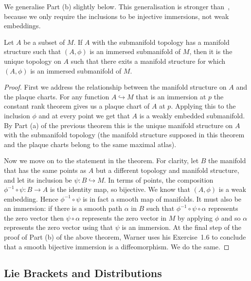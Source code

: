 We generalise Part (b) slightly below.
This generalisation is stronger than~\cite[Lem~2.1.41]{Sharpe1997}, because we only require the inclusions to be injective immersions, not weak embeddings.

\begin{theorem}
\label{thm:unique manifold structure}
Let $A$ be a subset of $M$. 
If $A$ with the submanifold topology has a manifold structure such that $(A,\phi)$ is an immersed submanifold of $M$, then it is the unique topology on $A$ such that there exits a manifold structure for which $(A,\phi)$ is an immersed submanifold of $M$.
\end{theorem}
\begin{proof}
First we address the relationship between the manifold structure on $A$ and the plaque charts.
For any function $A \hookrightarrow M$ that is an immersion at $p$ the constant rank theorem gives us a plaque chart of $A$ at $p$.
Applying this to the inclusion $\phi$ and at every point we get that $A$ is a weakly embedded submanifold.
By Part (a) of the previous theorem this is the unique manifold structure on $A$ with the submanifold topology (the manifold structure supposed in this theorem and the plaque charts belong to the same maximal atlas).

Now we move on to the statement in the theorem.
For clarity, let $B$ the manifold that has the same points as $A$ but a different topology and manifold structure, and let its inclusion be $\psi : B \hookrightarrow M$.
In terms of points, the composition $\phi^{-1} \circ \psi : B \to A$ is the identity map, so bijective.
We know that $(A,\phi)$ is a weak embedding.
Hence $\phi^{-1} \circ \psi$ is in fact a smooth map of manifolds.
It must also be an immersion: if there is a smooth path $\alpha$ in $B$ such that $\phi^{-1} \circ \psi \circ \alpha$ represents the zero vector then $\psi \circ \alpha$ represents the zero vector in $M$ by applying $\phi$ and so $\alpha$ represents the zero vector using that $\psi$ is an immersion. 
At the final step of the proof of Part (b) of the above theorem, Warner uses his Exercise~1.6 to conclude that a smooth bijective immersion is a diffeomorphism.
We do the same.
\end{proof}


\subsection{Lie Brackets and Distributions}

